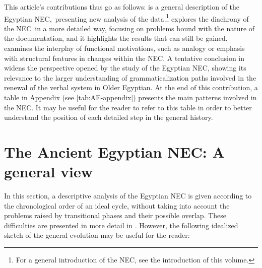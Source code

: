 \documentclass[output=paper]{langsci/langscibook}
\newcommand{\ꜥ}{ʿ}
\newcommand{\ꜣ}{\kern-.25pt\texttt{ꜣ}\kern-.6pt}
\begin{document}
This article’s contributions thus go as follows:  is a general description of the Egyptian NEC, presenting new analysis of the data.\footnote{ For a general introduction of the NEC, see the introduction of this volume.}  explores the diachrony of the NEC in a more detailed way, focusing on problems bound with the nature of the documentation, and it highlights the results that can still be gained.  examines the interplay of functional motivations, such as analogy or emphasis with structural features in changes within the NEC. A tentative conclusion in  widens the perspective opened by the study of the Egyptian NEC, showing its relevance to the larger understanding of grammaticalization paths involved in the renewal of the verbal system in Older Egyptian. At the end of this contribution, a table in Appendix (see \ref{tab:AE-appendix}) presents the main patterns involved in the NEC. It may be useful for the reader to refer to this table in order to better understand the position of each detailed step in the general history.


\section{The Ancient Egyptian NEC: A general view}\label{s:AE2}

In this section, a descriptive analysis of the Egyptian NEC is given according to the chronological order of an ideal cycle, without taking into account the problems raised by transitional phases and their possible overlap. These difficulties are presented in more detail in . However, the following idealized sketch of the general evolution may be useful for the reader:
\end{document}
